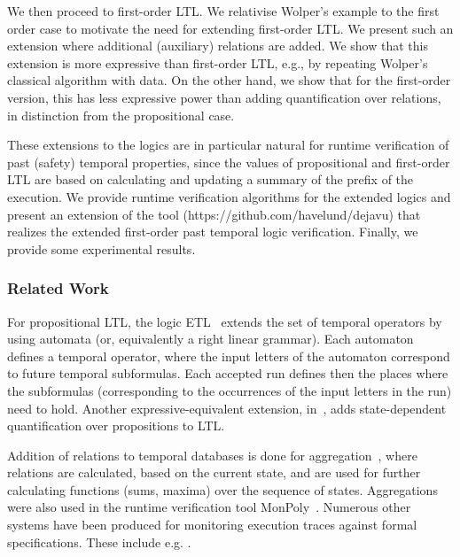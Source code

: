 We then proceed to first-order LTL. We relativise Wolper's example to the first
order case to motivate the need for
extending first-order LTL.
We present such an extension where additional (auxiliary) relations are
added. We show that this extension is more expressive than
first-order LTL, e.g., by repeating Wolper's classical algorithm
with data. On the other hand, we show that for the first-order version, this has less 
expressive power than adding quantification over relations, in distinction from the propositional case.

These extensions to the logics are in particular natural for
runtime verification of past (safety) temporal properties, since
the values of propositional and first-order LTL are based
on calculating and updating a summary of the prefix of the execution.
We provide runtime verification algorithms for the extended
logics and present an extension of the 
\dejavu{} tool (https://github.com/havelund/dejavu) that
realizes the extended first-order past temporal logic verification.
Finally, we provide some experimental results.


\subsubsection{Related Work}

For propositional LTL, the logic ETL~\cite{WVS,Wolper} extends
the set of temporal operators 
by using automata (or, equivalently a right linear grammar). Each automaton defines a temporal operator,
where the input letters of the automaton correspond to future temporal subformulas. Each accepted run defines then the places
where the subformulas (corresponding to the occurrences of the input letters in the run) need to hold. Another expressive-equivalent extension, 
in~\cite{Wolper}, adds
state-dependent quantification over propositions to LTL.

Addition of relations to temporal databases is done
for aggregation~\cite{Libkin}, where relations are
calculated, based on the current state, and are used for further calculating
functions (sums, maxima) over the sequence of states. Aggregations were also used in the runtime verification tool 
{\sf MonPoly}~\cite{agrebasin}.
%
%
Numerous other systems have been produced for monitoring
execution traces against formal specifications. 
These include e.g. \cite{Meredith2011,larva,Reger2015,halle-beepbeep-ieee-12,LOLA}. 


